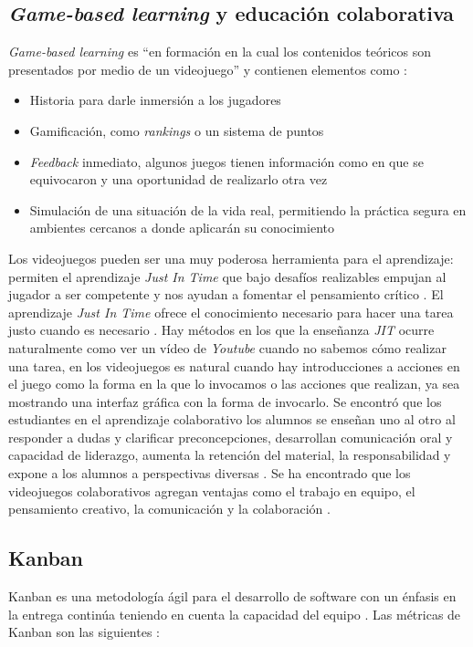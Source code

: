 \subsection{\textit{Game-based learning} y educación colaborativa}
\textit{Game-based learning} es “en formación en la cual los contenidos teóricos son presentados por medio de un videojuego” \cite{gamelearn2014a} y contienen elementos como \cite{gamelearn2017a}:
\begin{itemize}
    \item Historia para darle inmersión a los jugadores
    \item Gamificación, como \textit{rankings} o un sistema de puntos
    \item \textit{Feedback} inmediato, algunos juegos tienen información como en que se equivocaron y una oportunidad de realizarlo otra vez
    \item Simulación de una situación de la vida real, permitiendo la práctica segura en ambientes cercanos a donde aplicarán su conocimiento
\end{itemize}

Los videojuegos pueden ser una muy poderosa herramienta para el aprendizaje: permiten el aprendizaje \textit{Just In Time} que bajo desafíos realizables empujan al 
jugador a ser competente y nos ayudan a fomentar el pensamiento crítico \cite{levasseur-a}. 
El aprendizaje \textit{Just In Time} ofrece el conocimiento necesario para hacer una tarea justo cuando es necesario \cite{unknown2017a}. 
Hay métodos en los que la enseñanza \textit{JIT} ocurre naturalmente como ver un vídeo de \textit{Youtube} cuando no sabemos cómo realizar una tarea, 
en los videojuegos es natural cuando hay introducciones a acciones en el juego como la forma en la que lo invocamos o las acciones que realizan, 
ya sea mostrando una interfaz gráfica con la forma de invocarlo.
Se encontró que los estudiantes en el aprendizaje colaborativo los alumnos se enseñan uno al otro al responder a dudas y 
clarificar preconcepciones, desarrollan comunicación oral y capacidad de liderazgo, aumenta la retención del material, 
la responsabilidad y expone a los alumnos a perspectivas diversas \cite{university-a}.
Se ha encontrado que los videojuegos colaborativos agregan ventajas como el trabajo en equipo, el pensamiento creativo, 
la comunicación y la colaboración \cite{romano-a}.

\subsection{Kanban}
Kanban es una metodología ágil para el desarrollo de software con un énfasis 
en la entrega continúa teniendo en cuenta la capacidad del equipo \cite{romano-a}. 
Las métricas de Kanban son las siguientes \cite{najera2018a}:

